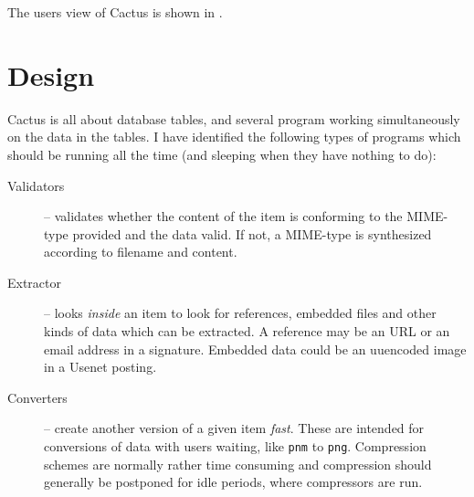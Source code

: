 The users view of Cactus is shown in
.

\section{Design}
\label{sec:cactus-design}

Cactus is all about database tables, and several program
working simultaneously on the data in the tables.  I have
identified the following types of programs which should be
running all the time (and sleeping when they have nothing to
do):

\begin{description}
  
\item[Validators] -- validates whether the content
  of the item is conforming to the MIME-type provided and
  the data valid.  If not, a MIME-type is synthesized
  according to filename and content.

  

  
\item[Extractor] -- looks \textit{inside} an item to look
  for references, embedded files and other kinds of data
  which can be extracted.  A reference may be an URL or an
  email address in a signature.  Embedded data could be an
  uuencoded image in a Usenet posting.
  
\item[Converters] -- create another version of a given item
  \textit{fast}.  These are intended for conversions of data
  with users waiting, like \texttt{pnm} to \texttt{png}.
  Compression schemes are normally rather time consuming and
  compression should generally be postponed for idle
  periods, where compressors are run.


  

\end{description}
